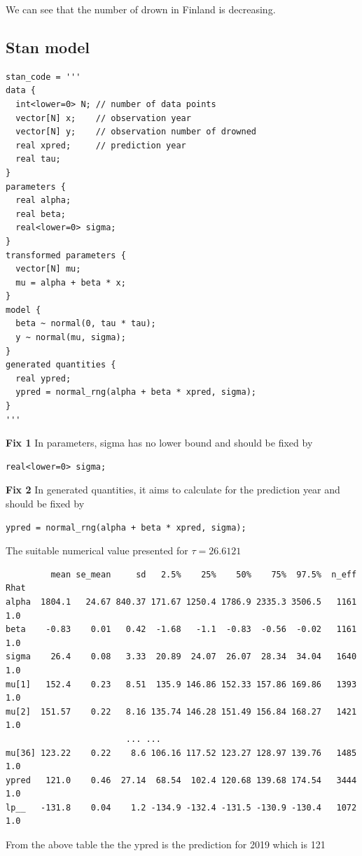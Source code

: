 \documentclass{article}
\begin{document}
We can see that the number of drown in Finland is decreasing.
\subsection*{Stan model}
\begin{verbatim}  
stan_code = '''
data {
  int<lower=0> N; // number of data points
  vector[N] x;    // observation year
  vector[N] y;    // observation number of drowned
  real xpred;     // prediction year
  real tau;
}
parameters {
  real alpha;
  real beta;
  real<lower=0> sigma;
}
transformed parameters {
  vector[N] mu;
  mu = alpha + beta * x;
}
model {
  beta ~ normal(0, tau * tau);
  y ~ normal(mu, sigma);
}
generated quantities {
  real ypred;
  ypred = normal_rng(alpha + beta * xpred, sigma);
}
'''
\end{verbatim}
\textbf{Fix 1} In parameters, sigma has no lower bound and should be fixed by
\begin{verbatim}  
real<lower=0> sigma;
\end{verbatim}
\textbf{Fix 2} In generated quantities, it aims to calculate for the prediction year and should be fixed by
 \begin{verbatim}  
ypred = normal_rng(alpha + beta * xpred, sigma);
\end{verbatim}

The suitable numerical value presented for $\tau=26.6121$

\begin{verbatim} 
         mean se_mean     sd   2.5%    25%    50%    75%  97.5%  n_eff   Rhat
alpha  1804.1   24.67 840.37 171.67 1250.4 1786.9 2335.3 3506.5   1161    1.0
beta    -0.83    0.01   0.42  -1.68   -1.1  -0.83  -0.56  -0.02   1161    1.0
sigma    26.4    0.08   3.33  20.89  24.07  26.07  28.34  34.04   1640    1.0
mu[1]   152.4    0.23   8.51  135.9 146.86 152.33 157.86 169.86   1393    1.0
mu[2]  151.57    0.22   8.16 135.74 146.28 151.49 156.84 168.27   1421    1.0
						... ...
mu[36] 123.22    0.22    8.6 106.16 117.52 123.27 128.97 139.76   1485    1.0
ypred   121.0    0.46  27.14  68.54  102.4 120.68 139.68 174.54   3444    1.0
lp__   -131.8    0.04    1.2 -134.9 -132.4 -131.5 -130.9 -130.4   1072    1.0
\end{verbatim}

From the above table the the ypred is the prediction for 2019 which is 121
\end{document}
